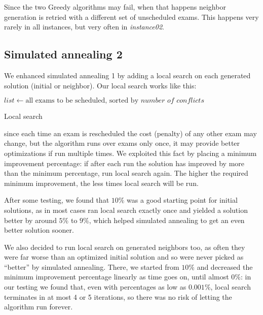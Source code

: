 \documentclass[11pt, a4paper, leqno]{article}
\begin{document}
	Since the two Greedy algorithms may fail, when that happens neighbor generation is retried with a different set of unscheduled exams. This happens very rarely in all instances, but very often in \textit{instance02}.
	
	\subsection{Simulated annealing 2}
	
	We enhanced simulated annealing 1 by adding a local search on each generated solution (initial or neighbor). Our local search works like this:
	
	\begin{algorithm}[H]
		$list \gets \text{all exams to be scheduled, sorted by }\textit{number of conflicts}$\;
		\caption{Local search}
	\end{algorithm}

	since each time an exam is rescheduled the cost (penalty) of any other exam may change, but the algorithm runs over exams only once, it may provide better optimizations if run multiple times. We exploited this fact by placing a minimum improvement percentage: if after each run the solution has improved by more than the minimum percentage, run local search again. The higher the required minimum improvement, the less times local search will be run.
	
	After some testing, we found that $10\%$ was a good starting point for initial solutions, as in most cases ran local search exactly once and yielded a solution better by around $5\%$ to $9\%$, which helped simulated annealing to get an even better solution sooner.
	
	We also decided to run local search on generated neighbors too, as often they were far worse than an optimized initial solution and so were never picked as ``better'' by simulated annealing. There, we started from $10\%$ and decreased the minimum improvement percentage linearly as time goes on, until almost $0\%$: in our testing we found that, even with percentages as low as $0.001\%$, local search terminates in at most 4 or 5 iterations, so there was no risk of letting the algorithm run forever.
	
\end{document}
